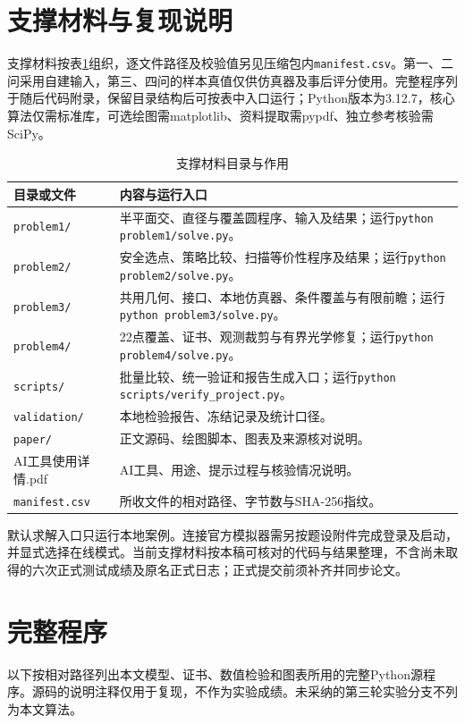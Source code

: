 \begin{appendixx}
\section{支撑材料与复现说明}
支撑材料按表\ref{tab:support}组织，逐文件路径及校验值另见压缩包内\texttt{manifest.csv}。第一、二问采用自建输入，第三、四问的样本真值仅供仿真器及事后评分使用。完整程序列于随后代码附录，保留目录结构后可按表中入口运行；Python版本为3.12.7，核心算法仅需标准库，可选绘图需matplotlib、资料提取需pypdf、独立参考核验需SciPy。
\begin{table}[H]
\centering\small
\caption{支撑材料目录与作用}\label{tab:support}
\begin{tabularx}{\textwidth}{lX}
\toprule
目录或文件 & 内容与运行入口\\
\midrule
\texttt{problem1/} & 半平面交、直径与覆盖圆程序、输入及结果；运行\texttt{python problem1/solve.py}。\\
\texttt{problem2/} & 安全选点、策略比较、扫描等价性程序及结果；运行\texttt{python problem2/solve.py}。\\
\texttt{problem3/} & 共用几何、接口、本地仿真器、条件覆盖与有限前瞻；运行\texttt{python problem3/solve.py}。\\
\texttt{problem4/} & 22点覆盖、证书、观测裁剪与有界光学修复；运行\texttt{python problem4/solve.py}。\\
\texttt{scripts/} & 批量比较、统一验证和报告生成入口；运行\texttt{python scripts/verify\_project.py}。\\
\texttt{validation/} & 本地检验报告、冻结记录及统计口径。\\
\texttt{paper/} & 正文源码、绘图脚本、图表及来源核对说明。\\
AI工具使用详情.pdf & AI工具、用途、提示过程与核验情况说明。\\
\texttt{manifest.csv} & 所收文件的相对路径、字节数与SHA-256指纹。\\
\bottomrule
\end{tabularx}
\end{table}
默认求解入口只运行本地案例。连接官方模拟器需另按题设附件完成登录及启动，并显式选择在线模式。当前支撑材料按本稿可核对的代码与结果整理，不含尚未取得的六次正式测试成绩及原名正式日志；正式提交前须补齐并同步论文。
\section{完整程序}
以下按相对路径列出本文模型、证书、数值检验和图表所用的完整Python源程序。源码的说明注释仅用于复现，不作为实验成绩。未采纳的第三轮实验分支不列为本文算法。
\end{appendixx}


